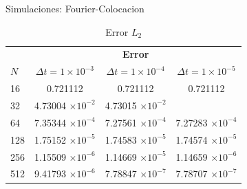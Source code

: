 \label{Tablas-Colocacion}
\begin{frame}{Simulaciones: Fourier-Colocacion \hspace{2cm} \hyperlink{Navegador}{}}
	\begin{table}
    \centering
	\begin{tabular}{lccc}
		\toprule
		\multicolumn{1}{c}{}& \multicolumn{3}{c}{\textbf{Error}} \\
		$N$& $\Delta t=1\times 10^{-3}$& $\Delta t=1\times 10^{-4}$& $\Delta t=1\times 10^{-5}$ \\
		\midrule
		16& 0.721112& 0.721112& 0.721112 \\
		\midrule
		32& 4.73004 $\times 10^{-2}$& 4.73015 $\times 10^{-2}$ \\
		\midrule
		64& 7.35344 $\times 10^{-4}$& 7.27561 $\times 10^{-4}$& 7.27283 $\times 10^{-4}$ \\
		\midrule
		128& 1.75152 $\times 10^{-5}$& 1.74583 $\times 10^{-5}$& 1.74574 $\times 10^{-5}$ \\
		\midrule
		256& 1.15509 $\times 10^{-6}$& 1.14669 $\times 10^{-5}$& 1.14659 $\times 10^{-6}$ \\
		\midrule
		512& 9.41793 $\times 10^{-6}$& 7.78847 $\times 10^{-7}$& 7.78707 $\times 10^{-7}$ \\
		\bottomrule
    	\end{tabular}
    	\caption{Error $L_2$}
\end{table}
\end{frame}

